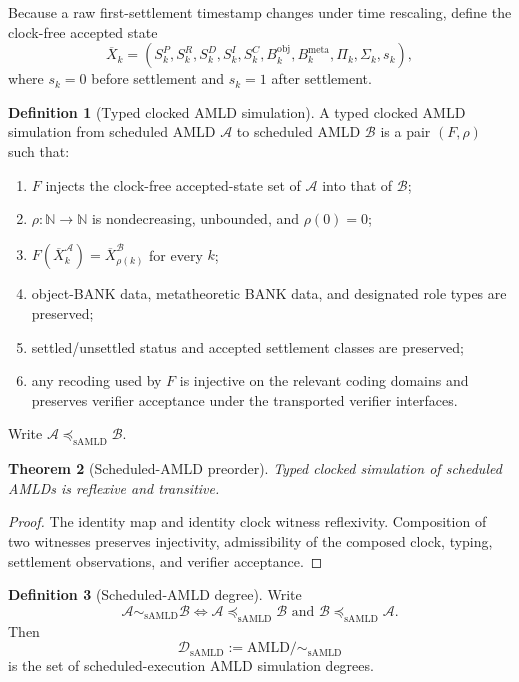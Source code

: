 \documentclass[11pt]{article}
\newtheorem{theorem}{Theorem}[section]
\theoremstyle{definition}
\newtheorem{definition}[theorem]{Definition}
\newcommand{\AMLD}{\mathrm{AMLD}}
\newcommand{\Damld}{\mathcal{D}_{\mathrm{sAMLD}}}
\newcommand{\simamld}{\sim_{\mathrm{sAMLD}}}
\newcommand{\preamld}{\preceq_{\mathrm{sAMLD}}}
\newcommand{\N}{\mathbb{N}}
\begin{document}
Because a raw first-settlement timestamp changes under time rescaling, define the clock-free accepted state
\[
\overline X_k=
(S_k^P,S_k^R,S_k^D,S_k^I,S_k^C,
B_k^{\mathrm{obj}},B_k^{\mathrm{meta}},\Pi_k,\Sigma_k,s_k),
\]
where $s_k=0$ before settlement and $s_k=1$ after settlement.

\begin{definition}[Typed clocked AMLD simulation]\label{def:amld-sim}
A typed clocked AMLD simulation from scheduled AMLD $\mathcal A$ to scheduled AMLD $\mathcal B$ is a pair $(F,\rho)$ such that:
\begin{enumerate}[label=(\roman*)]
    \item $F$ injects the clock-free accepted-state set of $\mathcal A$ into that of $\mathcal B$;
    \item $\rho:\N\to\N$ is nondecreasing, unbounded, and $\rho(0)=0$;
    \item $F(\overline X_k^{\mathcal A})=\overline X_{\rho(k)}^{\mathcal B}$ for every $k$;
    \item object-BANK data, metatheoretic BANK data, and designated role types are preserved;
    \item settled/unsettled status and accepted settlement classes are preserved;
    \item any recoding used by $F$ is injective on the relevant coding domains and preserves verifier acceptance under the transported verifier interfaces.
\end{enumerate}
Write $\mathcal A\preamld\mathcal B$.
\end{definition}

\begin{theorem}[Scheduled-AMLD preorder]
Typed clocked simulation of scheduled AMLDs is reflexive and transitive.
\end{theorem}

\begin{proof}
The identity map and identity clock witness reflexivity. Composition of two witnesses preserves injectivity, admissibility of the composed clock, typing, settlement observations, and verifier acceptance.
\end{proof}

\begin{definition}[Scheduled-AMLD degree]
Write
\[
\mathcal A\simamld\mathcal B
\Longleftrightarrow
\mathcal A\preamld\mathcal B\text{ and }\mathcal B\preamld\mathcal A.
\]
Then
\[
\Damld:=\AMLD/\!\simamld
\]
is the set of scheduled-execution AMLD simulation degrees.
\end{definition}
\end{document}
